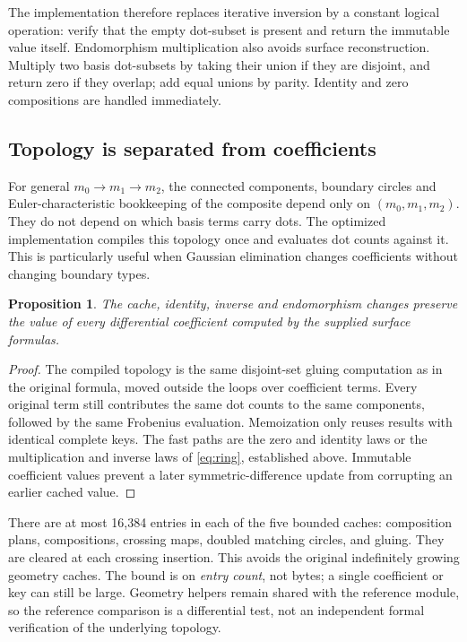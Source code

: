 \documentclass[11pt]{article}
\newtheorem{proposition}[theorem]{Proposition}
\theoremstyle{remark}\newtheorem{remark}[theorem]{Remark}
\begin{document}
The implementation therefore replaces iterative inversion by a constant
logical operation: verify that the empty dot-subset is present and return
the immutable value itself. Endomorphism multiplication also avoids
surface reconstruction. Multiply two basis dot-subsets by taking their
union if they are disjoint, and return zero if they overlap; add equal
unions by parity. Identity and zero compositions are handled immediately.

\subsection{Topology is separated from coefficients}
For general $m_0\to m_1\to m_2$, the connected components, boundary circles
and Euler-characteristic bookkeeping of the composite depend only on
$(m_0,m_1,m_2)$. They do not depend on which basis terms carry dots. The
optimized implementation compiles this topology once and evaluates dot
counts against it. This is particularly useful when Gaussian elimination
changes coefficients without changing boundary types.

\begin{proposition}
The cache, identity, inverse and endomorphism changes preserve the value of
every differential coefficient computed by the supplied surface formulas.
\end{proposition}
\begin{proof}
The compiled topology is the same disjoint-set gluing computation as in
the original formula, moved outside the loops over coefficient terms.
Every original term still contributes the same dot counts to the same
components, followed by the same Frobenius evaluation. Memoization only
reuses results with identical complete keys. The fast paths are the zero
and identity laws or the multiplication and inverse laws of
\eqref{eq:ring}, established above. Immutable coefficient values prevent
a later symmetric-difference update from corrupting an earlier cached value.
\end{proof}

There are at most 16,384 entries in each of the five bounded caches:
composition plans, compositions, crossing maps, doubled matching circles,
and gluing. They are cleared at each crossing insertion. This avoids the
original indefinitely growing geometry caches. The bound is on
\emph{entry count}, not bytes; a single coefficient or key can still be
large. Geometry helpers remain shared with the reference module, so the
reference comparison is a differential test, not an independent formal
verification of the underlying topology.
\end{document}
